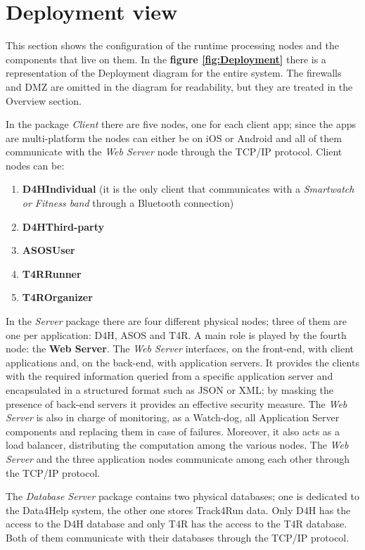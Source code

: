 \section{Deployment view}

This section shows the configuration of the runtime processing nodes and the components that live on them. In the \textbf{figure \ref{fig:Deployment}} there is a representation of the Deployment diagram for the entire system.
The firewalls and DMZ are omitted in the diagram for readability, but they are treated in the Overview section.

In the package \emph{Client} there are five nodes, one for each client app; since the apps are multi-platform the nodes can either be on iOS or Android and all of them communicate with the \emph{Web Server} node through the TCP/IP protocol. 
Client nodes can be:
\begin{enumerate}
    \item \textbf{D4HIndividual} (it is the only client that communicates with a \emph{Smartwatch or Fitness band} through a Bluetooth connection)
    \item \textbf{D4HThird-party}
    \item \textbf{ASOSUser}
    \item \textbf{T4RRunner}
    \item \textbf{T4ROrganizer}
\end{enumerate}

In the \emph{Server} package there are four different physical nodes; three of them are one per application: D4H, ASOS and T4R. A main role is played by the fourth node: the \textbf{Web Server}. The \emph{Web Server} interfaces, on the front-end, with client applications and, on the back-end, with application servers. It provides the clients with the required information queried from a specific application server and encapsulated in a structured format such as JSON or XML; by masking the presence of back-end servers it provides an effective security measure. The \emph{Web Server} is also in charge of monitoring, as a Watch-dog, all Application Server components and replacing them in case of failures. Moreover, it also acts as a load balancer, distributing the computation among the various nodes.
The \emph{Web Server} and the three application nodes communicate among each other through the TCP/IP protocol.

The \emph{Database Server} package contains two physical databases; one is dedicated to the Data4Help system, the other one stores Track4Run data. Only D4H has the access to the D4H database and only T4R has the access to the T4R database. Both of them communicate with their databases through the TCP/IP protocol.


